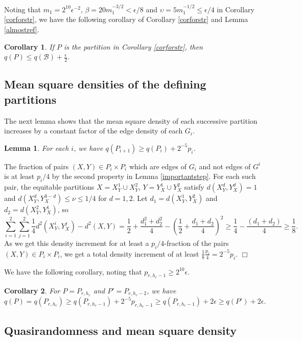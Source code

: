 \documentclass[11pt]{article}
\newtheorem{lemma}{Lemma}[section]
\newtheorem{corollary}{Corollary}[section]
\newenvironment{proof}
      {\medskip\noindent{\bf Proof:}\hspace{1mm}}
      {\hfill$\Box$\medskip}
\begin{document}
Noting that $m_1=2^{10}\epsilon^{-2}$, $\beta=20m_1^{-3/2}  < \epsilon/8$ and
$\upsilon=5m_1^{-1/2} \leq \epsilon/4$ in Corollary \ref{corforstr}, we have
the following corollary of Corollary \ref{corforstr} and Lemma \ref{almostref}.

\begin{corollary}
If $P$ is the partition in Corollary \ref{corforstr}, then $q(P) \leq
q(\mathcal{B})+\frac{\epsilon}{2}$.
\end{corollary}


\subsection{Mean square densities of the defining partitions}\label{msddp}

The next lemma shows that the mean square density of each successive partition
increases by a constant factor of the edge density of each $G_i$.

\begin{lemma}
For each $i$, we have $q(P_{i+1}) \geq q(P_i)+2^{-5}p_i$.
\end{lemma}
\begin{proof}
The fraction of pairs $(X,Y) \in P_i \times P_i$ which are edges of $G_i$ and not edges of $G^i$ is at
least $p_i/4$ by the second property in Lemma \ref{importantstep}. For each
such pair, the equitable partitions $X=X_Y^1 \cup X_Y^2$, $Y=Y_X^1 \cup Y_X^2$
satisfy $d(X_Y^d,Y_X^d)=1$ and $d(X_Y^d,Y_X^{3-d}) \leq \nu \leq 1/4$ for
$d=1,2$. Let $d_1=d(X_Y^1,Y_X^2)$ and $d_2=d(X_Y^2,Y_X^1)$, so
$$\sum_{i=1}^2\sum_{j=1}^2\frac{1}{4}d^2(X_Y^i,Y_X^j)-d^2(X,Y)=\frac{1}{2}+\frac{d_1^2+d_2^2}{4}-\left(\frac{1}{2}+\frac{d_1+d_2}{4}\right)^2 \geq \frac{1}{4}-\frac{(d_1+d_2)}{4}
\geq \frac{1}{8}.$$
As we get this density increment for at least a $p_i/4$-fraction of the pairs
$(X,Y) \in P_i \times P_i$, we get a total density increment of at least
$\frac{1}{8}\frac{p_i}{4}=2^{-5}p_i$.
\end{proof}

We have the following corollary, noting that $p_{r,h_r-1} \geq 2^{10}\epsilon$.

\begin{corollary}
For $P=P_{r,h_r}$ and $P'=P_{r,h_r-2}$, we have
$$q(P)=q(P_{r,h_r}) \geq q(P_{r,h_r-1})+2^{-5}p_{r,h_r-1}
\geq q(P_{r,h_r-1})+2\epsilon \geq q(P')+2\epsilon.$$
\end{corollary}
\subsection{Quasirandomness and mean square density} \label{qmsd}
\end{document}
